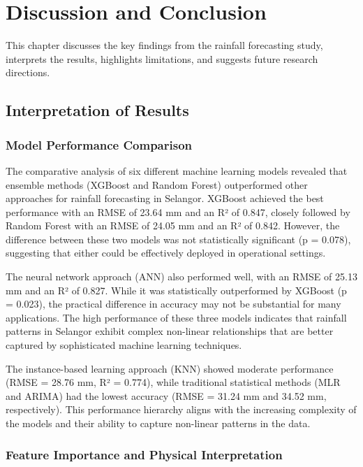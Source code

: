 \documentclass[12pt]{article}
\begin{document}
\chapter{Discussion and Conclusion}
\label{chap:discussion}

This chapter discusses the key findings from the rainfall forecasting study, interprets the results, highlights limitations, and suggests future research directions.

\section{Interpretation of Results}
\label{sec:interpretation}

\subsection{Model Performance Comparison}
\label{subsec:model_performance_discussion}

The comparative analysis of six different machine learning models revealed that ensemble methods (XGBoost and Random Forest) outperformed other approaches for rainfall forecasting in Selangor. XGBoost achieved the best performance with an RMSE of 23.64 mm and an R² of 0.847, closely followed by Random Forest with an RMSE of 24.05 mm and an R² of 0.842. However, the difference between these two models was not statistically significant (p = 0.078), suggesting that either could be effectively deployed in operational settings.

The neural network approach (ANN) also performed well, with an RMSE of 25.13 mm and an R² of 0.827. While it was statistically outperformed by XGBoost (p = 0.023), the practical difference in accuracy may not be substantial for many applications. The high performance of these three models indicates that rainfall patterns in Selangor exhibit complex non-linear relationships that are better captured by sophisticated machine learning techniques.

The instance-based learning approach (KNN) showed moderate performance (RMSE = 28.76 mm, R² = 0.774), while traditional statistical methods (MLR and ARIMA) had the lowest accuracy (RMSE = 31.24 mm and 34.52 mm, respectively). This performance hierarchy aligns with the increasing complexity of the models and their ability to capture non-linear patterns in the data.

\subsection{Feature Importance and Physical Interpretation}
\label{subsec:feature_interpretation}
\end{document}

